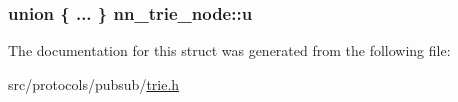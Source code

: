 \subsubsection[{u}]{\setlength{\rightskip}{0pt plus 5cm}union \{ ... \}   nn\+\_\+trie\+\_\+node\+::u}\hypertarget{structnn__trie__node_a2769fd778428eb659a86fdc725c6fbe4}{}\label{structnn__trie__node_a2769fd778428eb659a86fdc725c6fbe4}


The documentation for this struct was generated from the following file\+:\begin{DoxyCompactItemize}
\item 
src/protocols/pubsub/\hyperlink{trie_8h}{trie.\+h}\end{DoxyCompactItemize}
